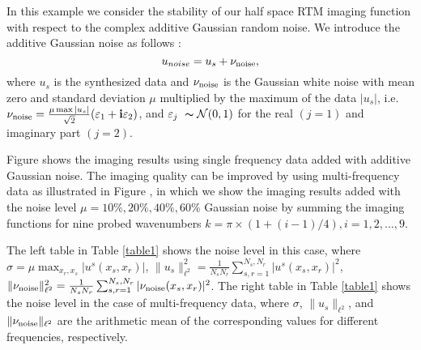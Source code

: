 \documentclass[11pt]{iopart}
\begin{document}
\begin{exmp}
{\rm In this example we consider the stability of our half space RTM imaging function with respect to the complex additive Gaussian random noise. We introduce the additive Gaussian noise as follows \cite{cch_a}:
    \begin{equation*}
        u_{noise} = u_s + \nu_{\rm noise},
    \end{equation*}
where $u_s$ is the synthesized data and $\nu_{\rm noise}$ is the Gaussian white noise with mean zero and standard deviation $\mu$ multiplied by the maximum of  the data $|u_s|$, i.e. $\nu_{\rm noise}=\frac{\mu \max|u_s|}{\sqrt{2}}({\varepsilon}_1 + \mathbf{i} {\varepsilon}_2)$, and ${\varepsilon}_j ~ \thicksim \mathcal{N}(0,1)$ for the real $(j=1)$ and imaginary part $(j=2)$.

Figure shows the imaging results using single frequency data added with additive Gaussian noise.  The imaging quality can be improved by using multi-frequency data as illustrated in Figure , in which we show the imaging results added with  the noise level $\mu =10\%, 20\%, 40\%, 60\%$ Gaussian noise by summing the imaging functions for nine probed wavenumbers $k=\pi\times(1+(i-1)/4),i=1,2,...,9$.

The left table in Table \ref{table1} shows the noise level in this case, where $\sigma=\mu \max_{x_r,x_s}|u^s(x_s,x_r)|$, $\|u_s\|_{\ell^2}^2=\frac{1}{N_sN_r}\sum^{N_s,N_r}_{s,r=1}|u^s(x_s,x_r)|^2$, $\|\nu_{\rm noise}\|_{\ell^2}^2 = \frac{1}{N_sN_r}\sum^{N_s,N_r}_{s,r=1}|\nu_{\rm noise}(x_s,x_r)|^2$.
The right table in Table \ref{table1} shows the noise level in the case of multi-frequency data, where $\sigma$, $\|u_s\|_{\ell^2}$, and $\|\nu_{\rm noise}\|_{\ell^2}$ are the arithmetic mean of the corresponding values for different frequencies, respectively. }
\end{exmp}
\end{document}
